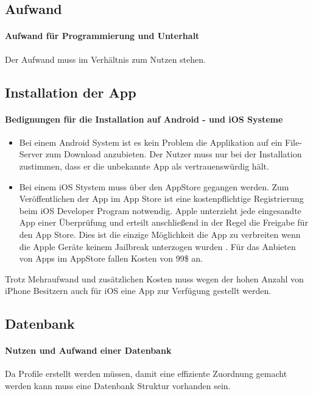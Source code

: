 \subsection{Aufwand}
\paragraph{Aufwand für Programmierung und Unterhalt} Der Aufwand muss im Verhältnis zum Nutzen stehen. 

\subsection{Installation der App}
\paragraph{Bedignungen für die Installation auf Android - und iOS Systeme}
\begin{itemize}
\item Bei einem Android System ist es kein Problem die Applikation auf ein File-Server zum Download anzubieten. Der Nutzer muss nur bei der Installation zustimmen, dass er die unbekannte App als vertrauenswürdig hält.
\item Bei einem iOS Stystem muss über den AppStore gegangen werden.  Zum Veröffentlichen der App im App Store ist eine kostenpflichtige Registrierung beim iOS Developer Program notwendig. Apple unterzieht jede eingesandte App einer Überprüfung und erteilt anschließend in der Regel die Freigabe für den App Store. Dies ist die einzige Möglichkeit die App zu verbreiten wenn die Apple Geräte keinem Jailbreak unterzogen wurden \cite{appStore}. Für das Anbieten von Apps im AppStore fallen Kosten von 99\$ an.
\end{itemize}
Trotz Mehraufwand und zusätzlichen Kosten muss wegen der hohen Anzahl von iPhone Besitzern auch für iOS eine App zur Verfügung gestellt werden.

\subsection{Datenbank}
\paragraph{Nutzen und Aufwand einer Datenbank}Da Profile erstellt werden müssen, damit eine effiziente Zuordnung gemacht werden kann muss eine Datenbank Struktur vorhanden sein.

